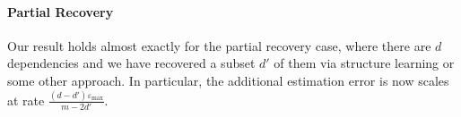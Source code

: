 \paragraph{Partial Recovery} Our result holds almost exactly for the partial recovery case, where there are $d$ dependencies and we have recovered a subset $d'$ of them via structure learning or some other approach. In particular, the additional estimation error is now scales at rate $\frac{(d - d') \varepsilon_{\max}  }{m - 2d'}$. 




